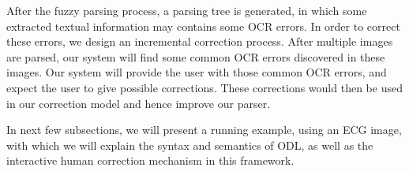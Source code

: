 After the fuzzy parsing process, a parsing tree is generated, in which some extracted textual 
information may contains some OCR errors. In order to correct these errors, we design an 
incremental correction process. 
After multiple images are parsed, our system will find some common OCR errors 
discovered in these images.  
Our system will provide the user with those common OCR errors, and expect 
the user to give possible corrections. 
These corrections would then be used in our correction model and hence improve our parser.





In next few subsections, we will present a running example, using
an ECG image, with
which we will explain the syntax and semantics of ODL, 
as well as the interactive human correction mechanism in this framework.

